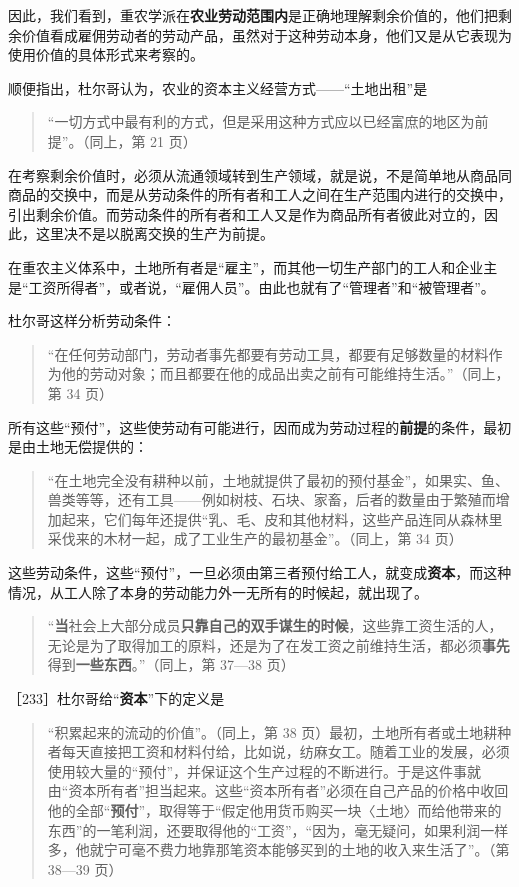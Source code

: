 因此，我们看到，重农学派在\textbf{农业劳动范围内}是正确地理解剩余价值的，他们把剩余价值看成雇佣劳动者的劳动产品，虽然对于这种劳动本身，他们又是从它表现为使用价值的具体形式来考察的。

顺便指出，杜尔哥认为，农业的资本主义经营方式——“土地出租”是

\begin{quote}“一切方式中最有利的方式，但是采用这种方式应以已经富庶的地区为前提”。（同上，第 21 页）\end{quote}

\fontbox{~\{}在考察剩余价值时，必须从流通领域转到生产领域，就是说，不是简单地从商品同商品的交换中，而是从劳动条件的所有者和工人之间在生产范围内进行的交换中，引出剩余价值。而劳动条件的所有者和工人又是作为商品所有者彼此对立的，因此，这里决不是以脱离交换的生产为前提。\fontbox{\}~}

\fontbox{~\{}在重农主义体系中，土地所有者是“雇主”，而其他一切生产部门的工人和企业主是“工资所得者”，或者说，“雇佣人员”。由此也就有了“管理者”和“被管理者”。\fontbox{\}~}

杜尔哥这样分析劳动条件：

\begin{quote}“在任何劳动部门，劳动者事先都要有劳动工具，都要有足够数量的材料作为他的劳动对象；而且都要在他的成品出卖之前有可能维持生活。”（同上，第 34 页）\end{quote}

所有这些“预付”，这些使劳动有可能进行，因而成为劳动过程的\textbf{前提}的条件，最初是由土地无偿提供的：

\begin{quote}“在土地完全没有耕种以前，土地就提供了最初的预付基金”，如果实、鱼、兽类等等，还有工具——例如树枝、石块、家畜，后者的数量由于繁殖而增加起来，它们每年还提供“乳、毛、皮和其他材料，这些产品连同从森林里采伐来的木材一起，成了工业生产的最初基金”。（同上，第 34 页）\end{quote}

这些劳动条件，这些“预付”，一旦必须由第三者预付给工人，就变成\textbf{资本}，而这种情况，从工人除了本身的劳动能力外一无所有的时候起，就出现了。

\begin{quote}“\textbf{当}社会上大部分成员\textbf{只靠自己的双手谋生的时候}，这些靠工资生活的人，无论是为了取得加工的原料，还是为了在发工资之前维持生活，都必须\textbf{事先}得到\textbf{一些东西}。”（同上，第 37—38 页）\end{quote}

［233］杜尔哥给“\textbf{资本}”下的定义是

\begin{quote}“积累起来的流动的价值”。（同上，第 38 页）最初，土地所有者或土地耕种者每天直接把工资和材料付给，比如说，纺麻女工。随着工业的发展，必须使用较大量的“预付”，并保证这个生产过程的不断进行。于是这件事就由“资本所有者”担当起来。这些“资本所有者”必须在自己产品的价格中收回他的全部“\textbf{预付}”，取得等于“假定他用货币购买一块〈土地〉而给他带来的东西”的一笔利润，还要取得他的“工资”，“因为，毫无疑问，如果利润一样多，他就宁可毫不费力地靠那笔资本能够买到的土地的收入来生活了”。（第 38—39 页）\end{quote}

